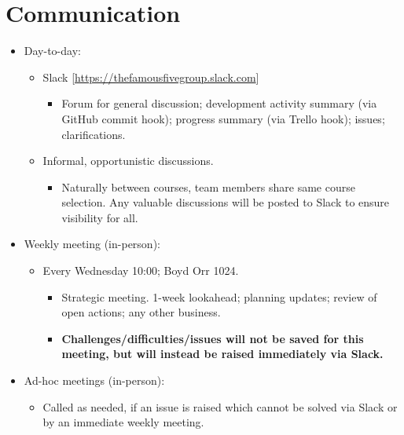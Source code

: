 \documentclass[a4paper, 12pt, titlepage]{article}
\begin{document}
	\section{Communication}
	\begin{itemize}
		\item Day-to-day:
		\begin{itemize}
			\item Slack [\url{https://thefamousfivegroup.slack.com}]
			\begin{itemize}
				\item Forum for general discussion; development activity summary (via GitHub commit hook); progress summary (via Trello hook); issues; clarifications.
			\end{itemize}
		\end{itemize}
		\begin{itemize}
			\item Informal, opportunistic discussions.
			\begin{itemize}
				\item Naturally between courses, team members share same course selection. Any valuable discussions will be posted to Slack to ensure visibility for all.
			\end{itemize}
		\end{itemize}

		\item Weekly meeting (in-person):
		\begin{itemize}
			\item Every Wednesday 10:00; Boyd Orr 1024.
			\begin{itemize}
				\item Strategic meeting. 1-week lookahead; planning updates; review of open actions; any other business.
				\item \textbf{Challenges/difficulties/issues will not be saved for this meeting, but will instead be raised immediately via Slack.}
			\end{itemize}
		\end{itemize}

		\item Ad-hoc meetings (in-person):
		\begin{itemize}
			\item Called as needed, if an issue is raised which cannot be solved via Slack or by an immediate weekly meeting.
		\end{itemize}
	\end{itemize}
\end{document}
